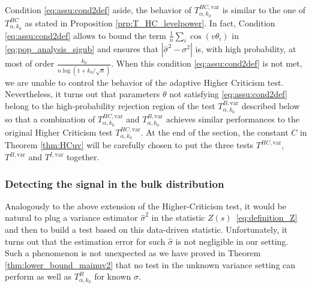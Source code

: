 \documentclass[twoside,11pt]{article}
\newcommand{\<}{\langle}
\renewcommand{\>}{\rangle}
\begin{document}
Condition \eqref{eq:assu:cond2def} aside, the behavior of $T^{HC,\mathrm{var}}_{\alpha,k_0}$ is similar to the one of $T^{HC}_{\alpha,k_0}$ as stated in Proposition \ref{prp:T_HC_levelpower}. In fact, Condition \eqref{eq:assu:cond2def} allows to bound the term $\frac{1}{n}\sum_{i}\cos(v\theta_i)$ in \eqref{eq:pop_analysis_sigub} and  ensures that $|\widehat{\sigma}^2-\sigma^2|$ is, with high probability, at most of order $\tfrac{k_0}{n \log(1+k_0/\sqrt{n})}$. When this condition \eqref{eq:assu:cond2def} is not met, we are unable to control the behavior of the adaptive Higher Criticism test. Nevertheless, it turns out that parameters $\theta$ not satisfying \eqref{eq:assu:cond2def} belong to the high-probability rejection region of the test $T^{B,\mathrm{var}}_{\alpha,k_0}$ described below so that a combination of $T^{HC,\mathrm{var}}_{\alpha,k_0}$ and $T^{B,\mathrm{var}}_{\alpha,k_0}$ achieves similar performances to the original Higher Criticism test $T^{HC,\mathrm{var}}_{\alpha,k_0}$. At the end of the section, the constant $C$ in Theorem \ref{thm:HCuv} will be carefully chosen to put the three tests $T^{HC,\mathrm{var}}$, $T^{B,\mathrm{var}}$ and $T^{I,\mathrm{var}}$ together.




\subsubsection{Detecting the signal in the bulk distribution}


Analogously to the above extension of the Higher-Criticism test, it would be natural to plug a variance estimator $\widehat{\sigma}^2$ in the statistic $Z(s)$~\eqref{eq:definition_Z} and then to build a test based on this data-driven statistic. Unfortunately, it turns out that the estimation error for such $\widehat{\sigma}$ is not negligible in our setting. Such a phenomenon is not unexpected as we have proved in Theorem \ref{thm:lower_bound_mainuv2} that no test in the unknown variance setting can perform as well as $T_{\alpha,k_0}^B$ for known $\sigma$. 
\end{document}
